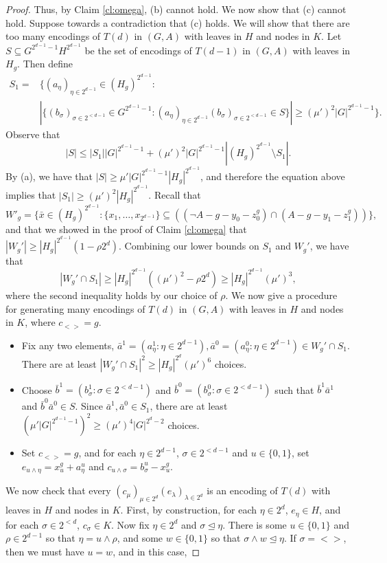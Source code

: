 \documentclass[12pt,oneside,british,a4wide]{amsart}
\numberwithin{equation}{section}
\theoremstyle{definition}
\newcommand{\abar}{\bar{a}}
\newcommand{\bbar}{\bar{b}}
\newcommand{\xbar}{\bar{x}}
\begin{document}
\begin{proof}
Thus, by Claim \ref{cl:omega}, (b) cannot hold.  We now show that (c) cannot hold. Suppose towards a contradiction that (c) holds.  We will show that there are too many encodings of $T(d)$ in $(G,A)$ with leaves in $H$ and nodes in $K$.  Let $S\subseteq G^{2^{d-1}-1}H^{2^{d-1}}$ be the set of encodings of $T(d-1)$ in $(G,A)$ with leaves in $H_g$.  Then define
\begin{align*}
S_1=&\{(a_{\eta})_{\eta\in 2^{d-1}}\in (H_g)^{2^{d-1}}:\\
&|\{ (b_{\sigma})_{ \sigma\in 2^{<d-1}}\in G^{2^{d-1}-1}: 
(a_{\eta})_{\eta\in 2^{d-1}}(b_{\sigma})_{ \sigma\in 2^{<d-1}}\in S\}|\geq (\mu')^2 |G|^{2^{d-1}-1}\}.
\end{align*}
Observe that 
$$
|S|\leq |S_1||G|^{2^{d-1}-1}+(\mu')^2 |G|^{2^{d-1}-1}|(H_g)^{2^{d-1}}\setminus S_1|.
$$
By (a), we have that $|S|\geq  \mu'|G|^{2^{d-1}-1}|H_g|^{2^{d-1}}$, and therefore the equation above implies that $|S_1|\geq (\mu')^2|H_g|^{2^{d-1}}$.  Recall that
$$
W'_g=\{\xbar\in (H_g)^{2^{d-1}}: \{x_1,\ldots, x_{2^{d-1}}\}\subseteq ((\neg A-g-y_0-z_0^g)\cap (A-g-y_1-z_1^g))\},
$$ 
and that we showed in the proof of Claim \ref{cl:omega} that $|W_g'|\geq |H_g|^{2^{d-1}}(1-\rho2^{d})$.  Combining our lower bounds on $S_1$ and $W_g'$, we have that
$$
|W_g'\cap S_1|\geq |H_g|^{2^{d-1}}((\mu')^2-\rho 2^d) \geq |H_g|^{2^{d-1}} (\mu')^3,
$$
where the second inequality holds by our choice of $\rho$.  We now give a procedure for generating many encodings of $T(d)$ in $(G,A)$ with leaves in $H$ and nodes in $K$, where $c_{<>}=g$.
\begin{itemize}
\item Fix any two elements, $\abar^1=(a^1_{\eta}: \eta\in 2^{d-1}), \abar^0=(a^0_{\eta}: \eta\in 2^{d-1})\in W_g'\cap S_1$.  There are at least $|W_g'\cap S_1|^2\geq  |H_g|^{2^{d}} (\mu')^6$ choices.
\item  Choose $\bbar^1=(b^1_{\sigma}:\sigma\in 2^{<d-1})$ and $\bbar^0=(b^0_{\sigma}:\sigma\in 2^{<d-1})$ such that $\bbar^1\abar^1$ and $\bbar^0\abar^0\in S$. Since $\abar^1,\abar^0\in S_1$, there are at least $(\mu' |G|^{2^{d-1}-1})^2\geq (\mu')^4 |G|^{2^{d}-2}$ choices.
\item  Set $c_{<>}=g$, and for each $\eta\in 2^{d-1}$, $\sigma\in 2^{<d-1}$ and $u\in \{0,1\}$, set $e_{u\wedge \eta}=x_u^g+a^u_{\eta}$ and $c_{u\wedge \sigma}=b_{\sigma}^u-x^g_u$.  
\end{itemize}
We now check that every $(c_{\mu})_{\mu\in 2^d}(e_{\lambda})_{\lambda\in 2^d}$ is an encoding of $T(d)$ with leaves in $H$ and nodes in $K$.  First, by construction, for each $\eta\in 2^d$, $e_{\eta}\in H$, and for each $\sigma\in 2^{<d}$, $c_{\sigma}\in K$.  Now fix $\eta\in 2^d$ and $\sigma\trianglelefteq \eta$.  There is some $u\in \{0,1\}$ and $\rho\in 2^{d-1}$ so that $\eta=u\wedge \rho$, and some $w\in \{0,1\}$ so that $\sigma \wedge w\trianglelefteq \eta$.  If $\sigma=<>$, then we must have $u=w$, and in this case,

\end{proof}
\end{document}
